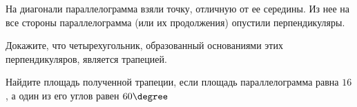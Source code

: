 \begin{ex}
	\begin{condition}
		На диагонали параллелограмма взяли точку, отличную от ее середины. Из нее на все стороны параллелограмма (или их продолжения) опустили перпендикуляры.
		\begin{enumcols}
			\item Докажите, что четырехугольник, образованный основаниями этих перпендикуляров, является трапецией.
			\item Найдите площадь полученной трапеции, если площадь параллелограмма равна \( 16 \), а один из его углов равен \( 60\degree \)
		\end{enumcols}
	\end{condition}
\end{ex}